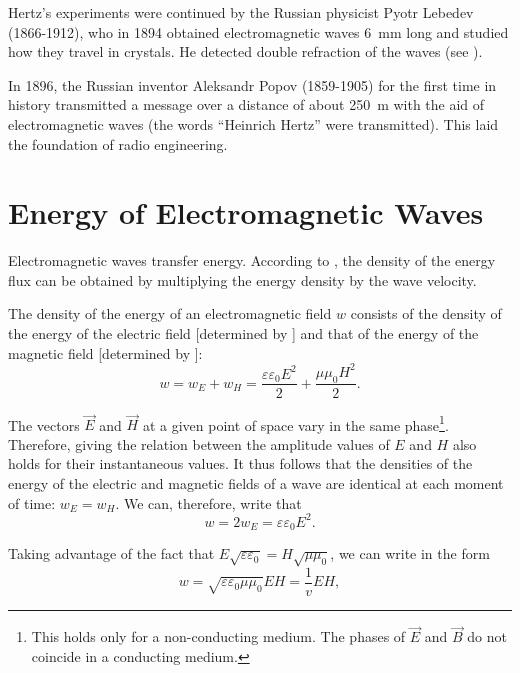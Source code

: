 Hertz's experiments were continued by the Russian physicist Pyotr Lebedev (1866-1912), who in 1894 obtained electromagnetic waves \SI{6}{\milli\metre} long and studied how they travel in crystals.
He detected double refraction of the waves (see ).

In 1896, the Russian inventor Aleksandr Popov (1859-1905) for the first time in history transmitted a message over a distance of about \SI{250}{\metre} with the aid of electromagnetic waves (the words ``Heinrich Hertz'' were transmitted).
This laid the foundation of radio engineering.

\section{Energy of Electromagnetic Waves}\label{sec:15_4}

Electromagnetic waves transfer energy.
According to , the density of the energy flux can be obtained by multiplying the energy density by the wave velocity.

The density of the energy of an electromagnetic field $w$ consists of the density of the energy of the electric field [determined by ] and that of the energy of the magnetic field [determined
by ]:
\begin{equation}\label{eq:15_26}
    w = w_E + w_H = \frac{\varepsilon\varepsilon_0 E^2}{2} + \frac{\mu\mu_0 H^2}{2}.
\end{equation}

\noindent
The vectors $\vec{E}$ and $\vec{H}$ at a given point of space vary in the same phase\footnote{This holds only for a non-conducting medium. The phases of $\vec{E}$ and $\vec{B}$ do not coincide in a conducting medium.}.
Therefore,  giving the relation between the amplitude values of $E$ and $H$ also holds for their instantaneous values.
It thus follows that the densities of the energy of the electric and magnetic fields of a wave are identical at each moment of time: $w_E = w_H$.
We can, therefore, write that
\begin{equation}\label{eq:15_27}
    w = 2 w_E = \varepsilon\varepsilon_0 E^2.
\end{equation}

Taking advantage of the fact that $E\sqrt{\varepsilon\varepsilon_0} = H \sqrt{\mu\mu_0}$, we can write  in the form
\begin{equation*}
    w = \sqrt{\varepsilon\varepsilon_0\mu\mu_0} EH = \frac{1}{v} EH,
\end{equation*}

